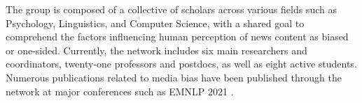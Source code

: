 The group is composed of a collective of scholars across various fields such as Psychology, Linguistics, and Computer Science, with a shared goal to comprehend the factors influencing human perception of news content as biased or one-sided. Currently, the network includes six main researchers and coordinators, twenty-one professors and postdocs, as well as eight active students. Numerous publications related to media bias have been published through the network at major conferences such as EMNLP 2021 \cite{spinde-2021-babe}.


